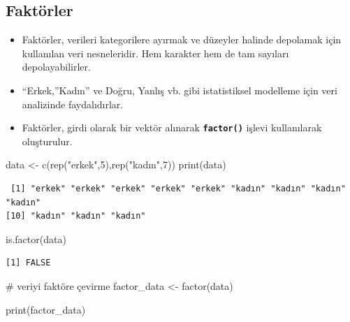 \documentclass[
  letterpaper,
  DIV=11,
  numbers=noendperiod]{scrreprt}
\newenvironment{Shaded}{\begin{snugshade}}{\end{snugshade}}
\newcommand{\CommentTok}[1]{\textcolor[rgb]{0.37,0.37,0.37}{#1}}
\newcommand{\DecValTok}[1]{\textcolor[rgb]{0.68,0.00,0.00}{#1}}
\newcommand{\FunctionTok}[1]{\textcolor[rgb]{0.28,0.35,0.67}{#1}}
\newcommand{\NormalTok}[1]{\textcolor[rgb]{0.00,0.23,0.31}{#1}}
\newcommand{\OtherTok}[1]{\textcolor[rgb]{0.00,0.23,0.31}{#1}}
\newcommand{\StringTok}[1]{\textcolor[rgb]{0.13,0.47,0.30}{#1}}
\begin{document}
\subsection{Faktörler}\label{faktuxf6rler}

\begin{itemize}
\item
  Faktörler, verileri kategorilere ayırmak ve düzeyler halinde depolamak
  için kullanılan veri nesneleridir. Hem karakter hem de tam sayıları
  depolayabilirler.
\item
  ``Erkek,''Kadın'' ve Doğru, Yanlış vb. gibi istatistiksel modelleme
  için veri analizinde faydalıdırlar.
\item
  Faktörler, girdi olarak bir vektör alınarak \textbf{\texttt{factor()}}
  işlevi kullanılarak oluşturulur.
\end{itemize}

\begin{Shaded}
\begin{Highlighting}[]
\NormalTok{data }\OtherTok{\textless{}{-}} \FunctionTok{c}\NormalTok{(}\FunctionTok{rep}\NormalTok{(}\StringTok{"erkek"}\NormalTok{,}\DecValTok{5}\NormalTok{),}\FunctionTok{rep}\NormalTok{(}\StringTok{"kadın"}\NormalTok{,}\DecValTok{7}\NormalTok{))}
\FunctionTok{print}\NormalTok{(data)}
\end{Highlighting}
\end{Shaded}

\begin{verbatim}
 [1] "erkek" "erkek" "erkek" "erkek" "erkek" "kadın" "kadın" "kadın" "kadın"
[10] "kadın" "kadın" "kadın"
\end{verbatim}

\begin{Shaded}
\begin{Highlighting}[]
\FunctionTok{is.factor}\NormalTok{(data)}
\end{Highlighting}
\end{Shaded}

\begin{verbatim}
[1] FALSE
\end{verbatim}

\begin{Shaded}
\begin{Highlighting}[]
\CommentTok{\# veriyi faktöre çevirme}
\NormalTok{factor\_data }\OtherTok{\textless{}{-}} \FunctionTok{factor}\NormalTok{(data)}

\FunctionTok{print}\NormalTok{(factor\_data)}
\end{Highlighting}
\end{Shaded}
\end{document}
